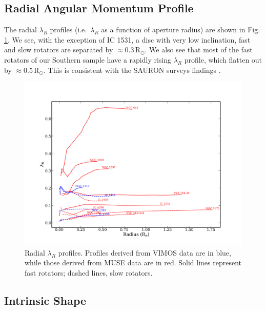 		\subsection{Radial Angular Momentum Profile}
			\label{subsec:ResolvedLambda_R}
			The radial $\lambda_R$ profiles (i.e.\ $\lambda_R$ as a function of aperture radius) are shown in Fig.\,\ref{fig:lambdaR_profile}. We see, with the exception of IC 1531, a disc with very low inclination, fast and slow rotators are separated by $\approx 0.3\,\mathrm{R_\odot}$. We also see that most of the fast rotators of our Southern sample have a rapidly rising $\lambda_R$ profile, which flatten out by $\approx 0.5\,\mathrm{R_\odot}$. This is consistent with the SAURON surveys findings \citep[e.g.][Fig.\,2]{Emsellem2007}. 

			\begin{figure}
				\centering
				\includegraphics[width=.7\textwidth]{chapter4/lambda_R.png}
				\caption[$\lambda_{R}$ radial profiles]{Radial $\lambda_{R}$ profiles. Profiles derived from VIMOS data are in blue, while those derived from MUSE data are in red. Solid lines represent fast rotators; dashed lines, slow rotators.}
				\label{fig:lambdaR_profile}
			\end{figure}

		
		\subsection{Intrinsic Shape}
			\label{subsec:Misalignment}

